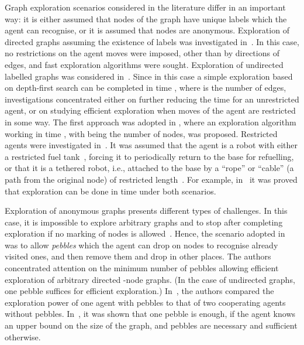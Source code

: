\documentclass[11pt,envcountsame,oribibl]{llncs}
\begin{document}
Graph exploration scenarios considered in the literature differ in
an important way: it is either assumed that nodes of the graph have
unique labels which the agent can recognise, or it is assumed that
nodes are anonymous. Exploration of directed graphs assuming the
existence of labels was investigated in~\cite{AlbHe00,DePa99,FT}. In this
case, no restrictions on the agent moves were imposed, other than by
directions of edges, and fast exploration algorithms were sought.
Exploration of undirected labelled graphs was considered
in~\cite{AwBS99,AK,BRS2,DunKK01,PaPe}. Since in this case a simple
exploration based on depth-first search can be completed in time
, where  is the number of edges, investigations concentrated
either on further reducing the time for an unrestricted agent, or on
studying efficient exploration when moves of the agent are
restricted in some way.  The first approach was adopted in
\cite{PaPe}, where an exploration algorithm working in time
, with  being the number of nodes, was proposed.
Restricted agents were investigated in~\cite{AwBS99,AK,BRS2,DunKK01}. It
was assumed that the agent is a robot with either a restricted fuel
tank~\cite{AwBS99,BRS2}, forcing it to periodically return to the base
for refuelling, or that it is a tethered robot, i.e., attached to
the base by a ``rope'' or ``cable'' (a path from the original node)
of restricted length~\cite{DunKK01}. For example, in~\cite{DunKK01} it was
proved  that exploration can be done in time  under both
scenarios.

Exploration of anonymous graphs presents different types of challenges.
In this case, it is impossible to explore arbitrary graphs
and to stop after completing exploration if no marking of nodes is
allowed~\cite{Bu78}. Hence, the scenario adopted in~\cite{BenFRSV98,BenSl94}
was to allow {\em pebbles} which the agent can drop on nodes to
recognise already visited ones, and then remove them and drop in
other places. The authors concentrated attention on the minimum
number of pebbles allowing efficient exploration of arbitrary
directed -node graphs. (In the case of undirected graphs, one
pebble suffices for efficient exploration.) In~\cite{BenSl94}, the
authors compared the exploration power of one agent with pebbles to
that of two cooperating agents without pebbles. In~\cite{BenFRSV98}, it
was shown that one pebble is enough, if the agent knows an upper
bound on the size of the graph, and  pebbles
are necessary and sufficient otherwise.
\end{document}
